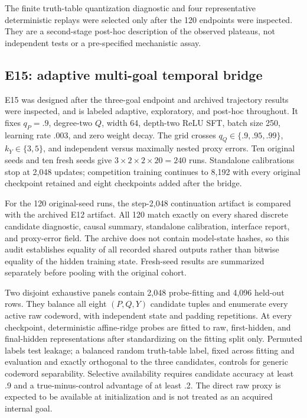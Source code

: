 \documentclass[11pt,a4paper]{article}
\begin{document}
The finite truth-table quantization diagnostic and four representative deterministic replays were selected only after the 120 endpoints were inspected. They are a second-stage post-hoc description of the observed plateaus, not independent tests or a pre-specified mechanistic assay.

\subsection{E15: adaptive multi-goal temporal bridge}

E15 was designed after the three-goal endpoint and archived trajectory results were inspected, and is labeled adaptive, exploratory, and post-hoc throughout. It fixes $q_P=.9$, degree-two $Q$, width 64, depth-two ReLU SFT, batch size 250, learning rate .003, and zero weight decay. The grid crosses $q_Q\in\{.9,.95,.99\}$, $k_Y\in\{3,5\}$, and independent versus maximally nested proxy errors. Ten original seeds and ten fresh seeds give $3\times2\times2\times20=240$ runs. Standalone calibrations stop at 2,048 updates; competition training continues to 8,192 with every original checkpoint retained and eight checkpoints added after the bridge.

For the 120 original-seed runs, the step-2,048 continuation artifact is compared with the archived E12 artifact. All 120 match exactly on every shared discrete candidate diagnostic, causal summary, standalone calibration, interface report, and proxy-error field. The archive does not contain model-state hashes, so this audit establishes equality of all recorded shared outputs rather than bitwise equality of the hidden training state. Fresh-seed results are summarized separately before pooling with the original cohort.

Two disjoint exhaustive panels contain 2,048 probe-fitting and 4,096 held-out rows. They balance all eight $(P,Q,Y)$ candidate tuples and enumerate every active raw codeword, with independent state and padding repetitions. At every checkpoint, deterministic affine-ridge probes are fitted to raw, first-hidden, and final-hidden representations after standardizing on the fitting split only. Permuted labels test leakage; a balanced random truth-table label, fixed across fitting and evaluation and exactly orthogonal to the three candidates, controls for generic codeword separability. Selective availability requires candidate accuracy at least .9 and a true-minus-control advantage of at least .2. The direct raw proxy is expected to be available at initialization and is not treated as an acquired internal goal.
\end{document}
